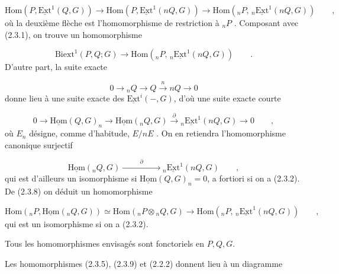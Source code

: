 \begin{equation}\tag{2.3.4}
\mathrm{Hom}(P,\underline{\mathrm{Ext}}^1(Q,G)) \to \mathrm{Hom}(P,\underline{\mathrm{Ext}}^1(nQ,G)) \to \mathrm{Hom}({}_nP,\,{}_n\underline{\mathrm{Ext}}^1(nQ,G)) \qquad ,
\end{equation}
où la deuxième flèche est l'homomorphisme de restriction à ${}_nP$ . Composant avec (2.3.1), on trouve un homomorphisme

\begin{equation}\tag{2.3.5}
\mathrm{Biext}^1(P,Q;G) \longrightarrow \mathrm{Hom}({}_nP,\,{}_n\underline{\mathrm{Ext}}^1(nQ,G)) \qquad .
\end{equation}
D'autre part, la suite exacte

\begin{equation}\tag{2.3.6}
0 \longrightarrow {}_nQ \longrightarrow Q \xrightarrow{\;n\;} nQ \longrightarrow 0
\end{equation}
donne lieu à une suite exacte des $\underline{\mathrm{Ext}}^i(-,G)$, d'où une suite exacte courte

\begin{equation}\tag{2.3.7}
0 \longrightarrow \underline{\mathrm{Hom}}(Q,G)_n \longrightarrow \underline{\mathrm{Hom}}({}_nQ,G) \xrightarrow{\;\partial\;} {}_n\underline{\mathrm{Ext}}^1(nQ,G) \longrightarrow 0 \qquad ,
\end{equation}
où $E_n$ désigne, comme d'habitude, $E/nE$ . On en retiendra l'homomorphisme canonique surjectif

\begin{equation}\tag{2.3.8}
\underline{\mathrm{Hom}}({}_nQ,G) \xrightarrow{\hspace{3em}\partial\hspace{3em}} {}_n\underline{\mathrm{Ext}}^1(nQ,G) \qquad ,
\end{equation}
qui est d'ailleurs un isomorphisme si $\underline{\mathrm{Hom}}(Q,G)_n = 0$, a fortiori si on a (2.3.2). De (2.3.8) on déduit un homomorphisme

\begin{equation}\tag{2.3.9}
\mathrm{Hom}({}_nP,\underline{\mathrm{Hom}}({}_nQ,G)) \simeq \mathrm{Hom}({}_nP \otimes {}_nQ,G) \longrightarrow \mathrm{Hom}({}_nP,\,{}_n\underline{\mathrm{Ext}}^1(nQ,G)) \qquad ,
\end{equation}
qui est un isomorphisme si on a (2.3.2).

Tous les homomorphismes envisagés sont fonctoriels en $P,Q,G$.

Les homomorphismes (2.3.5), (2.3.9) et (2.2.2) donnent lieu à un diagramme

